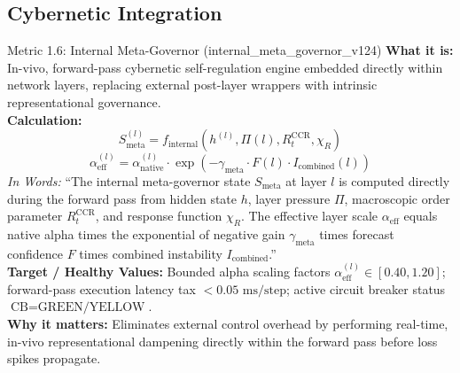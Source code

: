 \documentclass[11pt,a4paper]{article}
\begin{document}
\subsection{Cybernetic Integration}
\begin{metricbox}{Metric 1.6: Internal Meta-Governor (internal\_meta\_governor\_v124)}
\textbf{What it is:} In-vivo, forward-pass cybernetic self-regulation engine embedded directly within network layers, replacing external post-layer wrappers with intrinsic representational governance.\\
\textbf{Calculation:}
 $$S_{\text{meta}}^{(l)} = f_{\text{internal}}\left(h^{(l)}, \Pi(l), R_t^{\text{CCR}}, \chi_R\right)$$  $$\alpha_{\text{eff}}^{(l)} = \alpha_{\text{native}}^{(l)} \cdot \exp\left(-\gamma_{\text{meta}} \cdot F(l) \cdot I_{\text{combined}}(l)\right)$$ \emph{In Words:} ``The internal meta-governor state $S_{\text{meta}}$ at layer $l$ is computed directly during the forward pass from hidden state $h$, layer pressure $\Pi$, macroscopic order parameter $R_t^{\text{CCR}}$, and response function $\chi_R$. The effective layer scale $\alpha_{\text{eff}}$ equals native alpha times the exponential of negative gain $\gamma_{\text{meta}}$ times forecast confidence $F$ times combined instability $I_{\text{combined}}$.''\\
\textbf{Target / Healthy Values:} Bounded alpha scaling factors $\alpha_{\text{eff}}^{(l)} \in [0.40, 1.20]$; forward-pass execution latency tax $< 0.05\text{ ms/step}$; active circuit breaker status $\text{CB} = \text{GREEN/YELLOW}$.\\
\textbf{Why it matters:} Eliminates external control overhead by performing real-time, in-vivo representational dampening directly within the forward pass before loss spikes propagate.
\end{metricbox}
\end{document}
